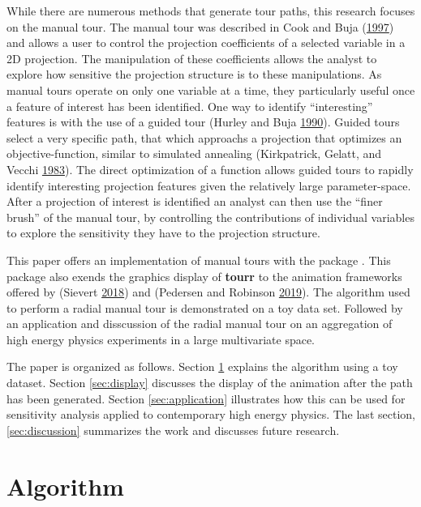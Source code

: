 While there are numerous methods that generate tour paths, this research
focuses on the manual tour. The manual tour was described in Cook and
Buja (\protect\hyperlink{ref-cook_manual_1997}{1997}) and allows a user
to control the projection coefficients of a selected variable in a 2D
projection. The manipulation of these coefficients allows the analyst to
explore how sensitive the projection structure is to these
manipulations. As manual tours operate on only one variable at a time,
they particularly useful once a feature of interest has been identified.
One way to identify ``interesting'' features is with the use of a guided
tour (Hurley and Buja
\protect\hyperlink{ref-hurley_analyzing_1990}{1990}). Guided tours
select a very specific path, that which approachs a projection that
optimizes an objective-function, similar to simulated annealing
(Kirkpatrick, Gelatt, and Vecchi
\protect\hyperlink{ref-kirkpatrick_optimization_1983}{1983}). The direct
optimization of a function allows guided tours to rapidly identify
interesting projection features given the relatively large
parameter-space. After a projection of interest is identified an analyst
can then use the ``finer brush'' of the manual tour, by controlling the
contributions of individual variables to explore the sensitivity they
have to the projection structure.

This paper offers an implementation of manual tours with the package
. This package also exends the graphics display of
\textbf{tourr} to the animation frameworks offered by 
(Sievert \protect\hyperlink{ref-sievert_plotly_2018}{2018}) and
 (Pedersen and Robinson
\protect\hyperlink{ref-pedersen_gganimate:_2019}{2019}). The algorithm
used to perform a radial manual tour is demonstrated on a toy data set.
Followed by an application and disscussion of the radial manual tour on
an aggregation of high energy physics experiments in a large
multivariate space.

The paper is organized as follows. Section \ref{sec:algorithm} explains
the algorithm using a toy dataset. Section \ref{sec:display} discusses
the display of the animation after the path has been generated. Section
\ref{sec:application} illustrates how this can be used for sensitivity
analysis applied to contemporary high energy physics. The last section,
\ref{sec:discussion} summarizes the work and discusses future research.

\hypertarget{sec:algorithm}{%
\section{Algorithm}\label{sec:algorithm}}

